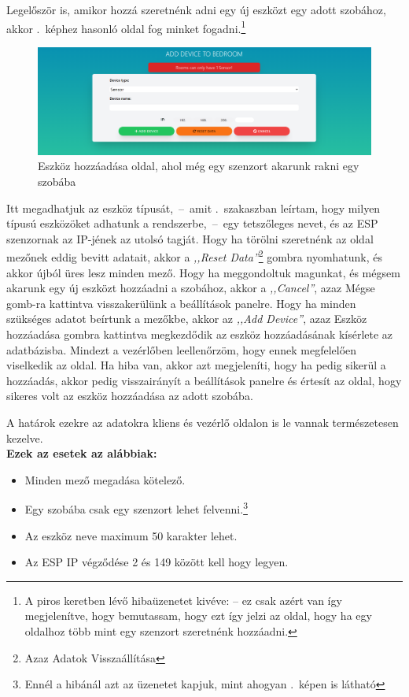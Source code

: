 \documentclass[
]{thesis-ekf}
\theoremstyle{definition}
\theoremstyle{remark}
\begin{document}
	Legelőször is, amikor hozzá szeretnénk adni egy új eszközt egy adott szobához, akkor .~képhez hasonló oldal fog minket fogadni.\footnote{A piros keretben lévő hibaüzenetet kivéve: -- ez csak azért van így megjelenítve, hogy bemutassam, hogy ezt így jelzi az oldal, hogy ha egy oldalhoz több mint egy szenzort szeretnénk hozzáadni.}
	
	\begin{figure}[ht!]
		\centering
		\includegraphics[width=1\textwidth]{./src/pages_img/sensor-error}
		\caption{Eszköz hozzáadása oldal, ahol még egy szenzort akarunk rakni egy szobába}
		\label{add-sensor-error}
	\end{figure}
	
	Itt megadhatjuk az eszköz típusát,~--~amit .~szakaszban leírtam, hogy milyen típusú eszközöket adhatunk a rendszerbe,~--~egy tetszőleges nevet, és az ESP szenzornak az IP-jének az utolsó tagját. Hogy ha törölni szeretnénk az oldal mezőnek eddig bevitt adatait, akkor a \emph{,,Reset Data''}\footnote{Azaz Adatok Visszaállítása} gombra nyomhatunk, és akkor újból üres lesz minden mező. Hogy ha meggondoltuk magunkat, és mégsem akarunk egy új eszközt hozzáadni a szobához, akkor a \emph{,,Cancel''}, azaz Mégse gomb-ra kattintva visszakerülünk a beállítások panelre. Hogy ha minden szükséges adatot beírtunk a mezőkbe, akkor az \emph{,,Add Device''}, azaz Eszköz hozzáadása gombra kattintva megkezdődik az eszköz hozzáadásának kísérlete az adatbázisba. Mindezt a vezérlőben leellenőrzöm, hogy ennek megfelelően viselkedik az oldal. Ha hiba van, akkor azt megjeleníti, hogy ha pedig sikerül a hozzáadás, akkor pedig visszairányít a beállítások panelre és értesít az oldal, hogy sikeres volt az eszköz hozzáadása az adott szobába.
	
	 A határok ezekre az adatokra kliens és vezérlő oldalon is le vannak természetesen kezelve.\\
	\textbf{Ezek az esetek az alábbiak:} 
	\begin{itemize}
		\item Minden mező megadása kötelező.
		\item Egy szobába csak egy szenzort lehet felvenni.\footnote{Ennél a hibánál azt az üzenetet kapjuk, mint ahogyan .~képen is látható}
		\item Az eszköz neve maximum 50 karakter lehet.
		\item Az ESP IP végződése 2 és 149 között kell hogy legyen.
	\end{itemize}
		
\end{document}
